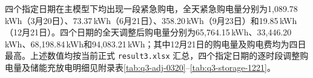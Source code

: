 四个指定日期在主模型下均出现一段紧急购电，全天紧急购电量分别为1{,}089.78\,kWh（3月20日）、73.37\,kWh（6月21日）、358.20\,kWh（9月23日）和19.85\,kWh（12月21日）。四个日期的全天调整后购电量分别为65{,}764.15\,kWh、33{,}446.20\,kWh、68{,}198.84\,kWh和94{,}083.21\,kWh；其中12月21日的购电量及购电费均为四日最高。上述数值均按当前正式 \texttt{result3.xlsx} 汇总，四个指定日期的逐时段调整购电量及储能充放电明细见附录表\ref{tab:q3-adj-0320}--\ref{tab:q3-storage-1221}。
